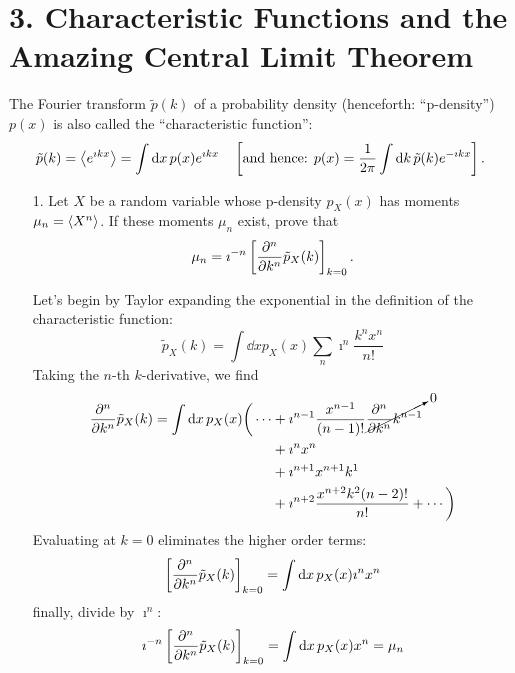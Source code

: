 \documentclass[a4paper,twoside]{article}
\begin{document}
\section*{3. Characteristic Functions and the Amazing Central Limit Theorem}
The Fourier transform $ \tilde{p}(k) $ of a probability density (henceforth: “p-density”) $ p(x) $ is also called the “characteristic function”:
\begin{equation}
    \tilde{p}(k) = \ev{e^{\imath k x}} = \int \dd{x} p(x) e^{\imath k x} \quad \left[ \text{and hence: } p(x) = \frac{1}{2 \pi} \int \dd{k} \tilde{p}(k)e^{- \imath k x} \right].
\end{equation}
\begin{itemize}
    \item[1.] Let $ X $ be a random variable whose p-density $ p_X(x) $ has moments $ \mu_n = \ev{X^n} $. If these moments $ \mu_n $ exist, prove that
        \begin{equation}
            \mu_n = \imath^{-n}\left[ \pdv[n]{k}\tilde{p}_X(k) \right]_{k=0}.
        \end{equation}
        \begin{problem}
            Let's begin by Taylor expanding the exponential in the definition of the characteristic function:
            \begin{equation}
                \tilde{p}_X(k) = \int \dd{x} p_X(x) \sum_n \imath^n \frac{k^n x^n}{n!} 
            \end{equation}
            Taking the $ n $-th $ k $-derivative, we find
            \begin{align}
                \pdv[n]{k} \tilde{p}_X(k) = \int \dd{x} p_X(x) \bigg( \cdots &+ \imath^{n-1} \frac{x^{n-1}}{(n-1)!} \cancelto{0}{\pdv[n]{k} k^{n-1}} \\ &+ \imath^{n} x^{n} \\&+ \imath^{n+1} x^{n+1} k^{1} \\ &+ \imath^{n+2} \frac{x^{n+2} k^{2} (n-2)!}{n!} + \cdots  \bigg)
            \end{align}
            Evaluating at $ k = 0 $ eliminates the higher order terms:
            \begin{equation}
                \left[ \pdv[n]{k} \tilde{p}_X(k) \right]_{k=0} = \int \dd{x} p_X(x) \imath^{n} x^n
            \end{equation}
            finally, divide by $ \imath^{n} $:
            \begin{equation}
                \imath^{-n}\left[ \pdv[n]{k}\tilde{p}_X(k) \right]_{k=0} = \int \dd{x} p_X(x) x^n = \mu_n
            \end{equation}


\end{problem}
\end{itemize}
\end{document}
